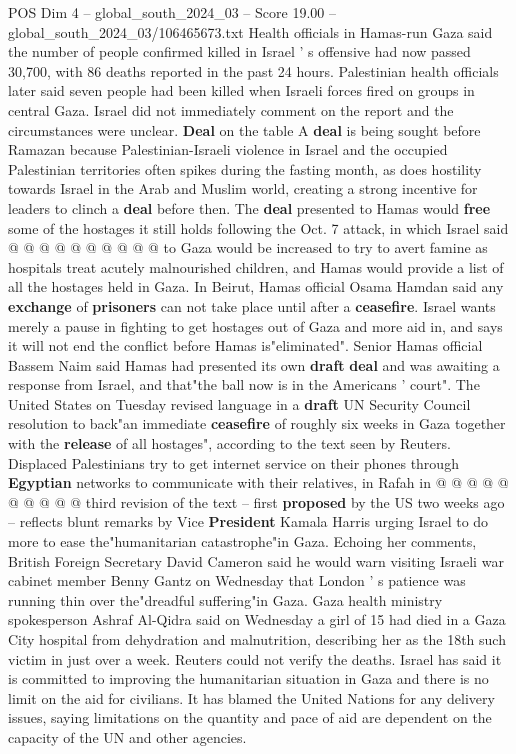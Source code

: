 \begin{textsample}{POS Dim 4 – global\_south\_2024\_03 – Score 19.00 – global\_south\_2024\_03/106465673.txt}
Health officials in Hamas-run Gaza said the number of people confirmed killed in Israel ' s offensive had now passed 30,700, with 86 deaths reported in the past 24 hours.
Palestinian health officials later said seven people had been killed when Israeli forces fired on groups in central Gaza.
Israel did not immediately comment on the report and the circumstances were unclear. \textbf{Deal} on the table A \textbf{deal} is being sought before Ramazan because Palestinian-Israeli violence in Israel and the occupied Palestinian territories often spikes during the fasting month, as does hostility towards Israel in the Arab and Muslim world, creating a strong incentive for leaders to clinch a \textbf{deal} before then.
The \textbf{deal} presented to Hamas would \textbf{free} some of the hostages it still holds following the Oct. 7 attack, in which Israel said @ @ @ @ @ @ @ @ @ @ to Gaza would be increased to try to avert famine as hospitals treat acutely malnourished children, and Hamas would provide a list of all the hostages held in Gaza.
In Beirut, Hamas official Osama Hamdan said any \textbf{exchange} of \textbf{prisoners} can not take place until after a \textbf{ceasefire}.
Israel wants merely a pause in fighting to get hostages out of Gaza and more aid in, and says it will not end the conflict before Hamas is"eliminated".
Senior Hamas official Bassem Naim said Hamas had presented its own \textbf{draft} \textbf{deal} and was awaiting a response from Israel, and that"the ball now is in the Americans ' court".
The United States on Tuesday revised language in a \textbf{draft} UN Security Council resolution to back"an immediate \textbf{ceasefire} of roughly six weeks in Gaza together with the \textbf{release} of all hostages", according to the text seen by Reuters.
Displaced Palestinians try to get internet service on their phones through \textbf{Egyptian} networks to communicate with their relatives, in Rafah in @ @ @ @ @ @ @ @ @ @ third revision of the text -- first \textbf{proposed} by the US two weeks ago -- reflects blunt remarks by Vice \textbf{President} Kamala Harris urging Israel to do more to ease the"humanitarian catastrophe"in Gaza.
Echoing her comments, British Foreign Secretary David Cameron said he would warn visiting Israeli war cabinet member Benny Gantz on Wednesday that London ' s patience was running thin over the"dreadful suffering"in Gaza.
Gaza health ministry spokesperson Ashraf Al-Qidra said on Wednesday a girl of 15 had died in a Gaza City hospital from dehydration and malnutrition, describing her as the 18th such victim in just over a week.
Reuters could not verify the deaths.
Israel has said it is committed to improving the humanitarian situation in Gaza and there is no limit on the aid for civilians.
It has blamed the United Nations for any delivery issues, saying limitations on the quantity and pace of aid are dependent on the capacity of the UN and other agencies.

\end{textsample}
